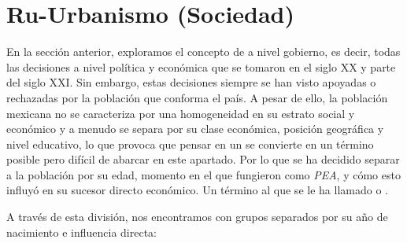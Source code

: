 
\section{Ru-Urbanismo (Sociedad)}
\label{sec:ru-urbanismo-sociedad}

En la sección anterior, exploramos el concepto de  a nivel gobierno, es decir, todas las
decisiones a nivel política y económica que se tomaron en el siglo XX y parte del siglo XXI. Sin embargo, estas
decisiones siempre se han visto apoyadas o rechazadas por la población que conforma el país. A pesar de ello,
la población mexicana no se caracteriza por una homogeneidad en su estrato social y económico y a menudo se separa
por su clase económica, posición geográfica y nivel educativo, lo que provoca que pensar en un
 se convierte en un término posible pero difícil de abarcar en este apartado.
Por lo que se ha decidido separar a la población por su edad, momento en el que fungieron como \textit{PEA}, y cómo
esto influyó en su sucesor directo económico. Un término al que se le ha llamado  o
.

A través de esta división, nos encontramos con grupos separados por su año de nacimiento e influencia directa:


